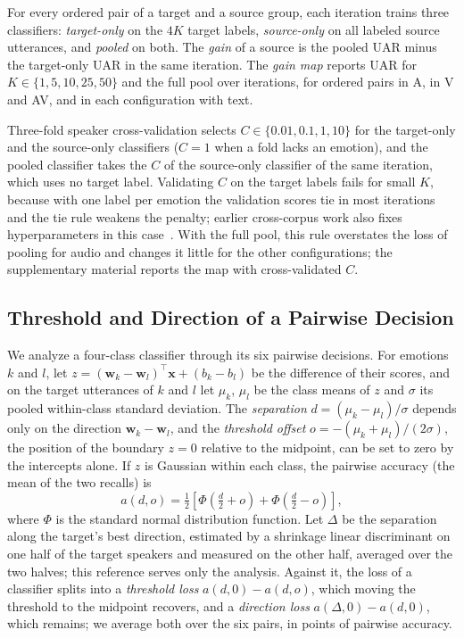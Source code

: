 For every ordered pair of a target and a source group, each iteration trains three classifiers: \emph{target-only} on the $4K$ target labels, \emph{source-only} on all labeled source utterances, and \emph{pooled} on both.
The \emph{gain} of a source is the pooled UAR minus the target-only UAR in the same iteration.
The \emph{gain map} reports UAR for $K \in \{1, 5, 10, 25, 50\}$ and the full pool over  iterations, for  ordered pairs in A,  in V and AV, and  in each configuration with text.

Three-fold speaker cross-validation selects $C \in \{0.01, 0.1, 1, 10\}$ for the target-only and the source-only classifiers ($C=1$ when a fold lacks an emotion), and the pooled classifier takes the $C$ of the source-only classifier of the same iteration, which uses no target label.
Validating $C$ on the target labels fails for small $K$, because with one label per emotion the validation scores tie in most iterations and the tie rule weakens the penalty; earlier cross-corpus work also fixes hyperparameters in this case~\cite{gideon2021addog}.
With the full pool, this rule overstates the loss of pooling for audio and changes it little for the other configurations; the supplementary material reports the map with cross-validated $C$.

\subsection{Threshold and Direction of a Pairwise Decision}
\label{sec:setting-model}

We analyze a four-class classifier through its six pairwise decisions.
For emotions $k$ and $l$, let $z = (\mathbf{w}_k - \mathbf{w}_l)^{\top}\mathbf{x} + (b_k - b_l)$ be the difference of their scores, and on the target utterances of $k$ and $l$ let $\mu_k$, $\mu_l$ be the class means of $z$ and $\sigma$ its pooled within-class standard deviation.
The \emph{separation} $d = (\mu_k - \mu_l)/\sigma$ depends only on the direction $\mathbf{w}_k - \mathbf{w}_l$, and the \emph{threshold offset} $o = -(\mu_k + \mu_l)/(2\sigma)$, the position of the boundary $z=0$ relative to the midpoint, can be set to zero by the intercepts alone.
If $z$ is Gaussian within each class, the pairwise accuracy (the mean of the two recalls) is
\begin{equation}
\label{eq:twocloud}
a(d, o) = \tfrac{1}{2}\left[\Phi\!\left(\tfrac{d}{2} + o\right) + \Phi\!\left(\tfrac{d}{2} - o\right)\right],
\end{equation}
where $\Phi$ is the standard normal distribution function.
Let $\Delta$ be the separation along the target's best direction, estimated by a shrinkage linear discriminant on one half of the target speakers and measured on the other half, averaged over the two halves; this reference serves only the analysis.
Against it, the loss of a classifier splits into a \emph{threshold loss} $a(d, 0) - a(d, o)$, which moving the threshold to the midpoint recovers, and a \emph{direction loss} $a(\Delta, 0) - a(d, 0)$, which remains; we average both over the six pairs, in points of pairwise accuracy.


